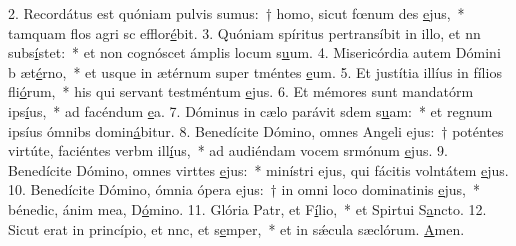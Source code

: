 2. Recordátus est quóniam pulvis sumus:~† homo, sicut fœnum des \uline{e}jus,~* tamquam flos agri sc efflor\uline{é}bit.
3. Quóniam spíritus pertransíbit in illo, et nn subs\uline{í}stet:~* et non cognóscet ámplis locum s\uline{u}um.
4. Misericórdia autem Dómini b æt\uline{é}rno,~* et usque in ætérnum super tméntes \uline{e}um.
5. Et justítia illíus in fílios fli\uline{ó}rum,~* his qui servant testméntum \uline{e}jus.
6. Et mémores sunt mandatórm ips\uline{í}us,~* ad facéndum \uline{e}a.
7. Dóminus in cælo parávit sdem s\uline{u}am:~* et regnum ipsíus ómnibs domin\uline{á}bitur.
8. Benedícite Dómino, omnes Angeli ejus:~† poténtes virtúte, faciéntes verbm ill\uline{í}us,~* ad audiéndam vocem srmónum \uline{e}jus.
9. Benedícite Dómino, omnes virttes \uline{e}jus:~* minístri ejus, qui fácitis volntátem \uline{e}jus.
10. Benedícite Dómino, ómnia ópera ejus:~† in omni loco dominatinis \uline{e}jus,~* bénedic, ánim mea, D\uline{ó}mino.
11. Glória Patr, et F\uline{í}lio,~* et Spirtui S\uline{a}ncto.
12. Sicut erat in princípio, et nnc, et s\uline{e}mper,~* et in sǽcula sæclórum. \uline{A}men.
